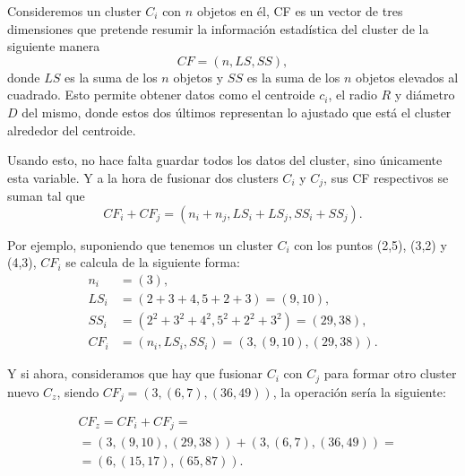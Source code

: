 \documentclass[10pt, a4paper]{article}
\begin{document}
Consideremos un cluster $C_i$ con $n$ objetos en él, CF es un vector de tres dimensiones que pretende resumir la información estadística del cluster de la siguiente manera \begin{equation} CF = \left(n, LS, SS \right ), \end{equation} donde $LS$ es la suma de los $n$ objetos y $SS$ es la suma de los $n$ objetos elevados al cuadrado. Esto permite obtener datos como el centroide $c_i$, el radio $R$ y diámetro $D$ del mismo, donde estos dos últimos representan lo ajustado que está el cluster alrededor del centroide. 

Usando esto, no hace falta guardar todos los datos del cluster, sino únicamente esta variable. Y a la hora de fusionar dos clusters $C_i$ y $C_j$, sus CF respectivos se suman tal que \begin{equation}CF_i + CF_j = \left (n_i + n_j, LS_i + LS_j, SS_i + SS_j \right ).\end{equation}

Por ejemplo, suponiendo que tenemos un cluster $C_i$ con los puntos (2,5), (3,2) y (4,3), $CF_i$ se calcula de la siguiente forma: 
\begin{align*}
n_i &= \left (3 \right), \\
LS_i &= \left (2 + 3 + 4, 5 + 2 + 3 \right) =  \left (9, 10 \right), \\
SS_i &= \left (2^2 + 3^2 + 4^2 , 5^2 + 2^2 + 3^2 \right) = \left (29, 38 \right), \\
CF_i &=  \left(n_i, LS_i, SS_i \right )= \left (3, \left (9, 10 \right), \left (29, 38 \right) \right).  
\end{align*}

Y si ahora, consideramos que hay que fusionar $C_i$ con $C_j$ para formar otro cluster nuevo $C_z$, siendo $CF_j = \left(3, \left(6,7 \right), \left(36,49 \right) \right)$, la operación sería la siguiente:

\begin{align*}
&CF_z = CF_i + CF_j = \\
&= \left(3, \left (9, 10 \right), \left (29, 38 \right) \right) +\left(3, \left(6,7 \right), \left(36,49 \right) \right)= \\
&= \left(6, \left(15,17 \right), \left(65,87 \right) \right).
\end{align*}

\end{document}
